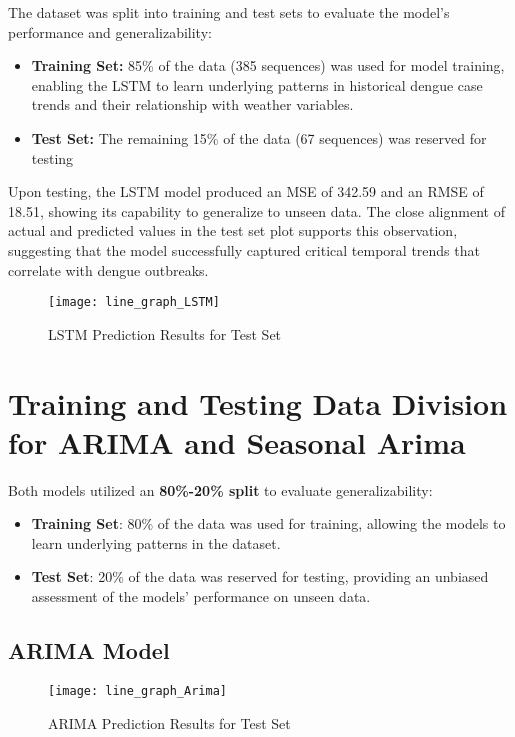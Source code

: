 The dataset was split into training and test sets to evaluate the model’s performance and generalizability:
\begin{itemize}
	\item \textbf{Training Set:} 85\% of the data (385 sequences) was used for model training, enabling the LSTM to learn underlying patterns in historical dengue case trends and their relationship with weather variables.
	\item \textbf{Test Set:} The remaining 15\% of the data (67 sequences) was reserved for testing
\end{itemize}

Upon testing, the LSTM model produced an MSE of 342.59 and an RMSE of 18.51, showing its capability to generalize to unseen data. The close alignment of actual and predicted values in the test set plot supports this observation, suggesting that the model successfully captured critical temporal trends that correlate with dengue outbreaks.

\begin{figure}[H]
	\centering
	\texttt{[image: line\_graph\_LSTM]}
	\caption{LSTM Prediction Results for Test Set}
	\label{fig:LSTM_result}
\end{figure}

\section*{Training and Testing Data Division for ARIMA and Seasonal Arima}
Both models utilized an \textbf{80\%-20\% split} to evaluate generalizability:
\begin{itemize}
	\item \textbf{Training Set}: 80\% of the data was used for training, allowing the models to learn underlying patterns in the dataset.
	\item \textbf{Test Set}: 20\% of the data was reserved for testing, providing an unbiased assessment of the models' performance on unseen data.
\end{itemize}
\subsection{ARIMA Model}

\begin{figure}[H]
	\centering
	\texttt{[image: line\_graph\_Arima]}
	\caption{ARIMA Prediction Results for Test Set}
	\label{fig:Arima_result}
\end{figure}


